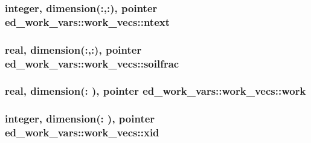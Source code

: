 \subsubsection[{ntext}]{\setlength{\rightskip}{0pt plus 5cm}integer, dimension(\+:,\+:), pointer ed\+\_\+work\+\_\+vars\+::work\+\_\+vecs\+::ntext}\label{structed__work__vars_1_1work__vecs_a898272bb541b0bd262ff3efe1a0f919d}
\hypertarget{structed__work__vars_1_1work__vecs_aaf7951b3fc6d10862e1a9110027766ea}{}
\subsubsection[{soilfrac}]{\setlength{\rightskip}{0pt plus 5cm}real, dimension(\+:,\+:), pointer ed\+\_\+work\+\_\+vars\+::work\+\_\+vecs\+::soilfrac}\label{structed__work__vars_1_1work__vecs_aaf7951b3fc6d10862e1a9110027766ea}
\hypertarget{structed__work__vars_1_1work__vecs_aa5dbf6c86b514fd72da0b0121693fcb9}{}
\subsubsection[{work}]{\setlength{\rightskip}{0pt plus 5cm}real, dimension(\+:  ), pointer ed\+\_\+work\+\_\+vars\+::work\+\_\+vecs\+::work}\label{structed__work__vars_1_1work__vecs_aa5dbf6c86b514fd72da0b0121693fcb9}
\hypertarget{structed__work__vars_1_1work__vecs_afff01fc8dd99c5d3bbe9bbea9234381a}{}
\subsubsection[{xid}]{\setlength{\rightskip}{0pt plus 5cm}integer, dimension(\+:  ), pointer ed\+\_\+work\+\_\+vars\+::work\+\_\+vecs\+::xid}\label{structed__work__vars_1_1work__vecs_afff01fc8dd99c5d3bbe9bbea9234381a}
\hypertarget{structed__work__vars_1_1work__vecs_a456fdc2f1a35f3a46bab6d6affac952e}{}
